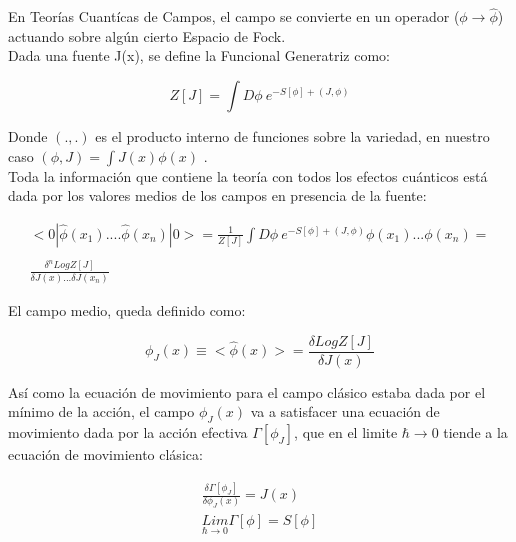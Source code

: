 En Teorías Cuantícas de Campos, el campo se convierte en un operador ($\phi \rightarrow \hat{\phi}$) actuando sobre algún cierto Espacio de Fock.\\   %


Dada una fuente J(x), se define la Funcional Generatriz como:

\begin{equation}
Z [J] = 
\int D \phi \ e ^{- S[ \phi ] + (J, \phi )}
\end{equation}

Donde $(.,.) $ es el producto interno de funciones sobre la variedad, en nuestro caso $(\phi,J) = \int J(x) \phi (x)$ . \\

Toda la información que contiene la teoría con todos los efectos cuánticos está dada por los valores medios de los campos en presencia de la fuente:

\begin{equation}
\begin{array}{c}
< 0 | \hat{ \phi  } (x _1) .... \hat{\phi  } (x _n) | 0 > = \frac{1}{Z[J]} 
\int D \phi \ e ^{- S[ \phi ] + (J, \phi )} \phi (x _1) ... \phi (x _n) = \\ \\
\frac{\delta ^n Log Z[J] }{ \delta J(x) ... \delta J(x _n) }
\end{array}
\end{equation}


El campo medio, queda definido como:

\begin{equation}
\phi _J (x) \equiv < \hat{\phi } (x) > = \frac{\delta Log Z[J] }{\delta J(x)} 
\end{equation}



Así como la ecuación de movimiento para el campo clásico estaba dada por el mínimo de la acción, el campo $ \phi _J (x) $ va a satisfacer una ecuación de movimiento dada por la acción efectiva $ \Gamma [\phi _J] $, que en el limite $\hbar \rightarrow 0$ tiende a la ecuación de movimiento clásica:


\begin{equation}
\begin{array}{c}
\frac{\delta \Gamma [ \phi _J ]  }{\delta \phi _J (x)  } = 
J (x) \\
\underset{ \hbar \rightarrow 0 }{ Lim  } \Gamma [ \phi  ] = S [ \phi ]
\end{array}
\label{eq.accion1}
\end{equation}

